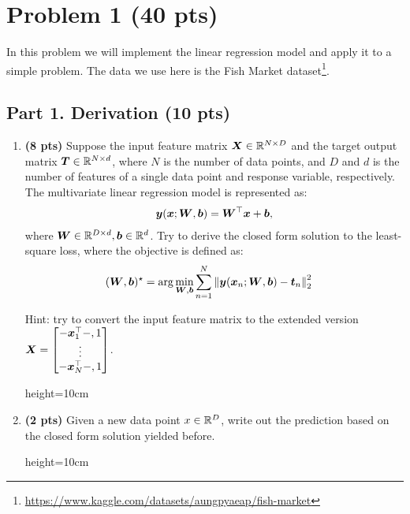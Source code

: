 
\section*{Problem 1 (40 pts)}

In this problem we will implement the linear regression model and apply it to a simple problem. The data we use here is the Fish Market dataset\footnote{\url{https://www.kaggle.com/datasets/aungpyaeap/fish-market}}.

\subsection*{Part 1. Derivation (10 pts)}
\begin{enumerate}
    \item \textbf{(8 pts)} Suppose the input feature matrix ${\bm{X}}\in \mathbb{R}^{N\times D}$ and the target output matrix ${\bm{T}}\in \mathbb{R}^{N\times d}$, where $N$ is the number of data points, and $D$ and $d$ is the number of features of a single data point and response variable, respectively.
    The multivariate linear regression model is represented as: 
    \begin{align*}
        {\bm{y}}({\bm{x}}; {\bm{W}}, {\bm{b}}) = {\bm{W}}^\top {\bm{x}} + {\bm{b}},
    \end{align*}
    where ${\bm{W}}\in\mathbb{R}^{D\times d}, {\bm{b}}\in\mathbb{R}^{d}$.
    Try to derive the closed form solution to the least-square loss, where the objective is defined as:
    \begin{align*}
        ({\bm{W}}, {\bm{b}})^\star 
        &= \arg\min_{{\bm{W}}, {\bm{b}}} \sum_{n=1}^N \left\|{\bm{y}}({\bm{x}}_n; {\bm{W}}, {\bm{b}}) - {\bm{t}}_n\right\|_2^2
    \end{align*}
    
    Hint: try to convert the input feature matrix to the extended version ${\bm{X}} = 
    \begin{bmatrix} 
    -{\bm{x}}_1^\top-, 1 \\ 
    \vdots\\
    -{\bm{x}}_N^\top-, 1
    \end{bmatrix}$.

    \begin{soln}{height=10cm}
    \end{soln}
    
    \item \textbf{(2 pts)} Given a new data point $x\in \mathbb{R}^{D}$, write out the prediction based on the closed form solution yielded before.
    \begin{soln}{height=10cm}
    \end{soln}
\end{enumerate}        


